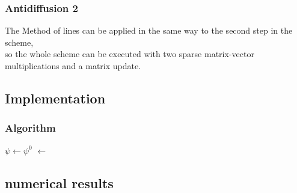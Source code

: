 \documentclass[hyperref={pdfstartview=Fit}]{beamer}
\begin{document}
\begin{frame}
\frametitle{Antidiffusion 2}
The Method of lines can be applied in the same way to the second step in the scheme,\\
 so the whole scheme can be executed with two sparse matrix-vector multiplications and a matrix update.
\end{frame}

\subsection{Implementation}
\begin{frame}
\frametitle{Algorithm}
\begin{algorithm}[H]
\BlankLine
$\psi \leftarrow \psi^0$\;
\Mone $\leftarrow$ \;
\end{algorithm}
\end{frame}

\subsection{numerical results}

%
%
%
%
%
%
%
%



\end{document}
